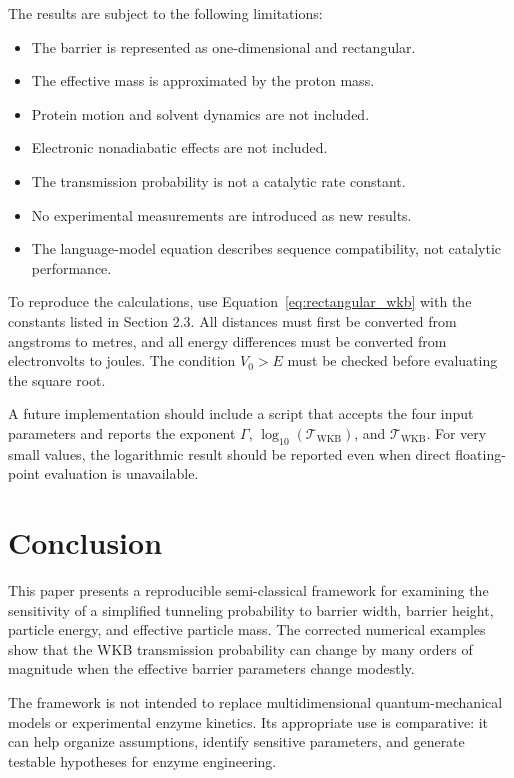 \documentclass[11pt,a4paper]{article}
\newcommand{\WKB}{\mathrm{WKB}}
\newcommand{\trans}{\mathcal{T}}
\begin{document}
The results are subject to the following limitations:

\begin{itemize}[leftmargin=2em]
    \item The barrier is represented as one-dimensional and rectangular.
    \item The effective mass is approximated by the proton mass.
    \item Protein motion and solvent dynamics are not included.
    \item Electronic nonadiabatic effects are not included.
    \item The transmission probability is not a catalytic rate constant.
    \item No experimental measurements are introduced as new results.
    \item The language-model equation describes sequence compatibility, not
    catalytic performance.
\end{itemize}

To reproduce the calculations, use Equation~\eqref{eq:rectangular_wkb} with
the constants listed in Section 2.3. All distances must first be converted from
angstroms to metres, and all energy differences must be converted from
electronvolts to joules. The condition $V_0>E$ must be checked before evaluating
the square root.

A future implementation should include a script that accepts the four input
parameters and reports the exponent $\Gamma$, $\log_{10}(\trans_{\WKB})$, and
$\trans_{\WKB}$. For very small values, the logarithmic result should be
reported even when direct floating-point evaluation is unavailable.

\section{Conclusion}

This paper presents a reproducible semi-classical framework for examining the
sensitivity of a simplified tunneling probability to barrier width, barrier
height, particle energy, and effective particle mass. The corrected numerical
examples show that the WKB transmission probability can change by many orders
of magnitude when the effective barrier parameters change modestly.

The framework is not intended to replace multidimensional quantum-mechanical
models or experimental enzyme kinetics. Its appropriate use is comparative:
it can help organize assumptions, identify sensitive parameters, and generate
testable hypotheses for enzyme engineering.
\end{document}
